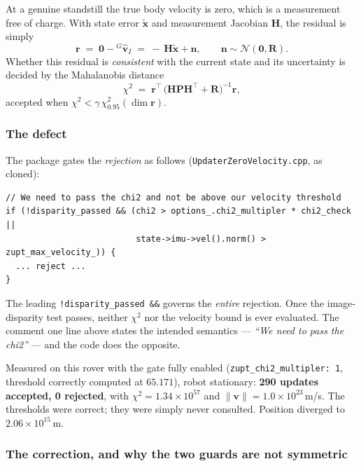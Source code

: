 At a genuine standstill the true body velocity is zero, which is a measurement
free of charge. With state error $\tilde{\mathbf{x}}$ and measurement Jacobian
$\mathbf{H}$, the residual is simply
%
\begin{equation}
  \mathbf{r} \;=\; \mathbf{0} - {}^{G}\hat{\mathbf{v}}_{I}
  \;=\; -\,\mathbf{H}\tilde{\mathbf{x}} + \mathbf{n},
  \qquad \mathbf{n}\sim\mathcal{N}(\mathbf{0},\mathbf{R}).
  \label{eq:zuptres}
\end{equation}
%
Whether this residual is \emph{consistent} with the current state and its
uncertainty is decided by the Mahalanobis distance
%
\begin{equation}
  \chi^{2} \;=\; \mathbf{r}^{\top}\,
  \bigl(\mathbf{H}\mathbf{P}\mathbf{H}^{\top} + \mathbf{R}\bigr)^{-1}\mathbf{r},
  \label{eq:zuptchi2}
\end{equation}
%
accepted when $\chi^{2} < \gamma\,\chi^{2}_{0.95}(\dim\mathbf{r})$.

\subsubsection{The defect}

The package gates the \emph{rejection} as follows
(\texttt{UpdaterZeroVelocity.cpp}, as cloned):

\begin{verbatim}
// We need to pass the chi2 and not be above our velocity threshold
if (!disparity_passed && (chi2 > options_.chi2_multipler * chi2_check ||
                          state->imu->vel().norm() > zupt_max_velocity_)) {
  ... reject ...
}
\end{verbatim}

The leading \verb|!disparity_passed &&| governs the \emph{entire} rejection.
Once the image-disparity test passes, neither $\chi^{2}$ nor the velocity bound
is ever evaluated. The comment one line above states the intended semantics
--- \emph{``We need to pass the chi2''} --- and the code does the opposite.

Measured on this rover with the gate fully enabled
(\texttt{zupt\_chi2\_multipler:~1}, threshold correctly computed at $65.171$),
robot stationary: \textbf{290 updates accepted, 0 rejected}, with
$\chi^{2}=1.34\times10^{57}$ and $\lVert\mathbf{v}\rVert=1.0\times10^{23}$\,m/s.
The thresholds were correct; they were simply never consulted. Position
diverged to $2.06\times10^{15}$\,m.

\subsubsection{The correction, and why the two guards are not symmetric}


